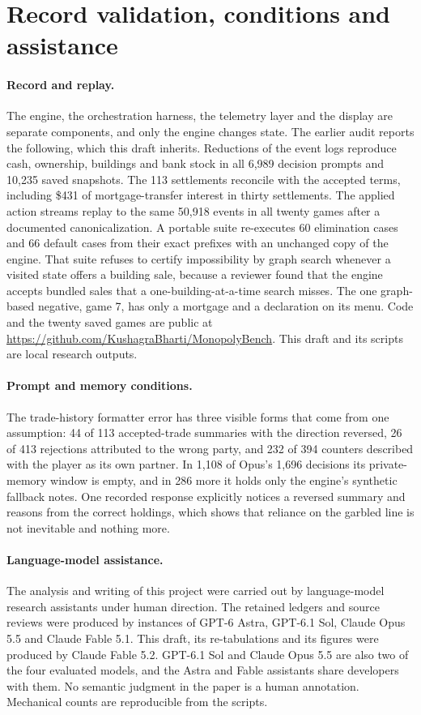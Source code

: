 \section{Record validation, conditions and assistance}
\label{app:validation}

\paragraph{Record and replay.} The engine, the orchestration harness, the telemetry layer and the display are separate components, and only the engine changes state. The earlier audit reports the following, which this draft inherits. Reductions of the event logs reproduce cash, ownership, buildings and bank stock in all 6,989 decision prompts and 10,235 saved snapshots. The 113 settlements reconcile with the accepted terms, including \$431 of mortgage-transfer interest in thirty settlements. The applied action streams replay to the same 50,918 events in all twenty games after a documented canonicalization. A portable suite re-executes 60 elimination cases and 66 default cases from their exact prefixes with an unchanged copy of the engine. That suite refuses to certify impossibility by graph search whenever a visited state offers a building sale, because a reviewer found that the engine accepts bundled sales that a one-building-at-a-time search misses. The one graph-based negative, game 7, has only a mortgage and a declaration on its menu. Code and the twenty saved games are public at \url{https://github.com/KushagraBharti/MonopolyBench}. This draft and its scripts are local research outputs.

\paragraph{Prompt and memory conditions.} The trade-history formatter error has three visible forms that come from one assumption: 44 of 113 accepted-trade summaries with the direction reversed, 26 of 413 rejections attributed to the wrong party, and 232 of 394 counters described with the player as its own partner. In 1,108 of Opus's 1,696 decisions its private-memory window is empty, and in 286 more it holds only the engine's synthetic fallback notes. One recorded response explicitly notices a reversed summary and reasons from the correct holdings, which shows that reliance on the garbled line is not inevitable and nothing more.

\paragraph{Language-model assistance.} The analysis and writing of this project were carried out by language-model research assistants under human direction. The retained ledgers and source reviews were produced by instances of GPT-6 Astra, GPT-6.1 Sol, Claude Opus 5.5 and Claude Fable 5.1. This draft, its re-tabulations and its figures were produced by Claude Fable 5.2. GPT-6.1 Sol and Claude Opus 5.5 are also two of the four evaluated models, and the Astra and Fable assistants share developers with them. No semantic judgment in the paper is a human annotation. Mechanical counts are reproducible from the scripts.

